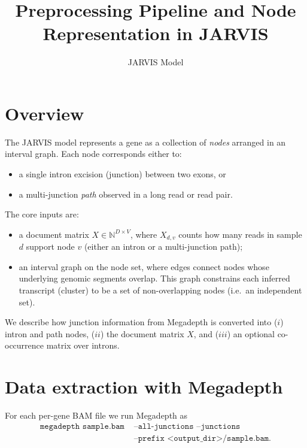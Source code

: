 \documentclass[11pt]{article}
\title{Preprocessing Pipeline and Node Representation in JARVIS}
\author{JARVIS Model}
\date{}
\begin{document}
\maketitle

\section{Overview}

The JARVIS model represents a gene as a collection of \emph{nodes} arranged in
an interval graph. Each node corresponds either to:
\begin{itemize}
  \item a single intron excision (junction) between two exons, or
  \item a multi-junction \emph{path} observed in a long read or read pair.
\end{itemize}

The core inputs are:
\begin{itemize}
  \item a document matrix \(X \in \mathbb{N}^{D \times V}\), where
  \(X_{d,v}\) counts how many reads in sample \(d\) support node \(v\)
  (either an intron or a multi-junction path);
  \item an interval graph on the node set, where edges connect nodes whose
  underlying genomic segments overlap. This graph constrains each inferred
  transcript (cluster) to be a set of non-overlapping nodes (i.e.\ an
  independent set).
\end{itemize}

We describe how junction information from Megadepth is converted into
(\(i\)) intron and path nodes, (\(ii\)) the document matrix \(X\), and
(\(iii\)) an optional co-occurrence matrix over introns.

\section{Data extraction with Megadepth}

For each per-gene BAM file we run Megadepth as
\begin{align*}
  \texttt{megadepth\ sample.bam\ } &\texttt{--all-junctions --junctions} \\
                                   &\texttt{--prefix\ <output\_dir>/sample.bam.}
\end{align*}
\end{document}
